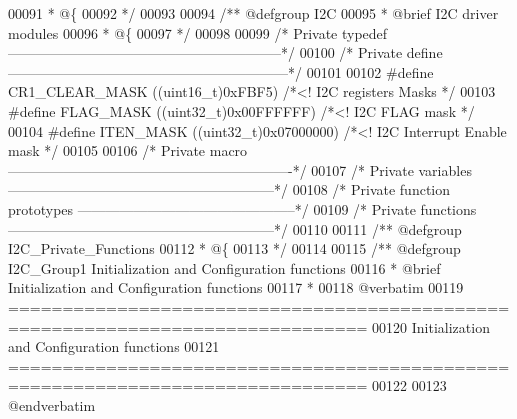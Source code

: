 \begin{DoxyCode}
00091 \textcolor{comment}{  * @\{}
00092 \textcolor{comment}{  */}
00093 
00094 \textcolor{comment}{/** @defgroup I2C }
00095 \textcolor{comment}{  * @brief I2C driver modules}
00096 \textcolor{comment}{  * @\{}
00097 \textcolor{comment}{  */}
00098 
00099 \textcolor{comment}{/* Private typedef -----------------------------------------------------------*/}
00100 \textcolor{comment}{/* Private define ------------------------------------------------------------*/}
00101 
00102 \textcolor{preprocessor}{#}\textcolor{preprocessor}{define} \textcolor{preprocessor}{CR1\_CLEAR\_MASK}    \textcolor{preprocessor}{(}\textcolor{preprocessor}{(}\textcolor{preprocessor}{uint16\_t}\textcolor{preprocessor}{)}0xFBF5\textcolor{preprocessor}{)}      \textcolor{comment}{/*<! I2C registers Masks */}
00103 \textcolor{preprocessor}{#}\textcolor{preprocessor}{define} \textcolor{preprocessor}{FLAG\_MASK}         \textcolor{preprocessor}{(}\textcolor{preprocessor}{(}\textcolor{preprocessor}{uint32\_t}\textcolor{preprocessor}{)}0x00FFFFFF\textcolor{preprocessor}{)}  \textcolor{comment}{/*<! I2C FLAG mask */}
00104 \textcolor{preprocessor}{#}\textcolor{preprocessor}{define} \textcolor{preprocessor}{ITEN\_MASK}         \textcolor{preprocessor}{(}\textcolor{preprocessor}{(}\textcolor{preprocessor}{uint32\_t}\textcolor{preprocessor}{)}0x07000000\textcolor{preprocessor}{)}  \textcolor{comment}{/*<! I2C Interrupt Enable mask */}
00105 
00106 \textcolor{comment}{/* Private macro -------------------------------------------------------------*/}
00107 \textcolor{comment}{/* Private variables ---------------------------------------------------------*/}
00108 \textcolor{comment}{/* Private function prototypes -----------------------------------------------*/}
00109 \textcolor{comment}{/* Private functions ---------------------------------------------------------*/}
00110 
00111 \textcolor{comment}{/** @defgroup I2C\_Private\_Functions}
00112 \textcolor{comment}{  * @\{}
00113 \textcolor{comment}{  */}
00114 
00115 \textcolor{comment}{/** @defgroup I2C\_Group1 Initialization and Configuration functions}
00116 \textcolor{comment}{ *  @brief   Initialization and Configuration functions }
00117 \textcolor{comment}{ *}
00118 \textcolor{comment}{@verbatim   }
00119 \textcolor{comment}{ ===============================================================================}
00120 \textcolor{comment}{                   Initialization and Configuration functions}
00121 \textcolor{comment}{ ===============================================================================  }
00122 \textcolor{comment}{}
00123 \textcolor{comment}{@endverbatim}

\end{DoxyCode}
